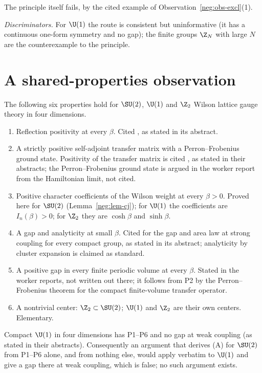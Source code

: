 The principle itself fails, by the cited example of Observation~\ref{neg:obs-excl}(1).

\emph{Discriminators.} For $\U(1)$ the route is consistent but uninformative (it has a continuous
one-form symmetry and no gap); the finite groups $\Z_N$ with large $N$ are the counterexample to
the principle.

\section{A shared-properties observation}\label{sec:shared}

\begin{observation}\label{neg:obs-shared}
The following six properties hold for $\SU(2)$, $\U(1)$ and $\Z_2$ Wilson lattice gauge theory
in four dimensions.
\begin{enumerate}
\item[P1] Reflection positivity at every $\beta$. Cited \cite{OS78}, as stated in its abstract.
\item[P2] A strictly positive self-adjoint transfer matrix with a Perron--Frobenius ground
state. Positivity of the transfer matrix is cited \cite{OS78,Lu77}, as stated in their
abstracts; the Perron--Frobenius ground state is argued in the worker report from the
Hamiltonian limit, not cited.
\item[P3] Positive character coefficients of the Wilson weight at every $\beta>0$. Proved here
for $\SU(2)$ (Lemma~\ref{neg:lem-cj}); for $\U(1)$ the coefficients are $I_n(\beta)>0$; for
$\Z_2$ they are $\cosh\beta$ and $\sinh\beta$.
\item[P4] A gap and analyticity at small $\beta$. Cited \cite{OS78} for the gap and area law at
strong coupling for every compact group, as stated in its abstract; analyticity by cluster
expansion is claimed as standard.
\item[P5] A positive gap in every finite periodic volume at every $\beta$. Stated in the worker
reports, not written out there; it follows from P2 by the Perron--Frobenius theorem for the
compact finite-volume transfer operator.
\item[P6] A nontrivial center: $\Z_2\subset\SU(2)$; $\U(1)$ and $\Z_2$ are their own centers.
Elementary.
\end{enumerate}
Compact $\U(1)$ in four dimensions has P1--P6 and no gap at weak coupling \cite{Guth80,FS82}
(as stated in their abstracts). Consequently an argument that derives (A) for $\SU(2)$ from
P1--P6 alone, and from nothing else, would apply verbatim to $\U(1)$ and give a gap there at weak
coupling, which is false; no such argument exists.
\end{observation}

